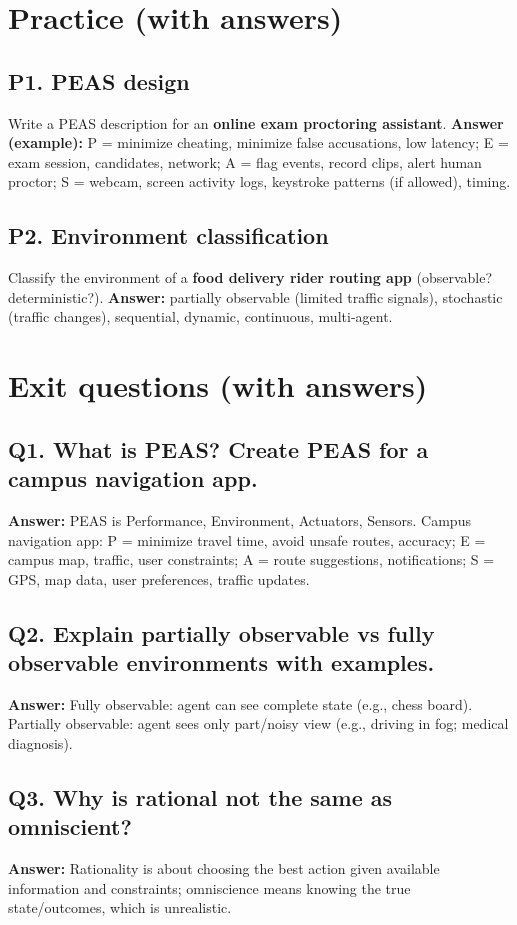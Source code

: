 \documentclass[11pt]{article}
\begin{document}
\section{Practice (with answers)}

\subsection*{P1. PEAS design}
Write a PEAS description for an \textbf{online exam proctoring assistant}.
\textbf{Answer (example):} P = minimize cheating, minimize false accusations, low latency; E = exam session, candidates, network; A = flag events, record clips, alert human proctor; S = webcam, screen activity logs, keystroke patterns (if allowed), timing.

\subsection*{P2. Environment classification}
Classify the environment of a \textbf{food delivery rider routing app} (observable? deterministic?).
\textbf{Answer:} partially observable (limited traffic signals), stochastic (traffic changes), sequential, dynamic, continuous, multi-agent.

\section{Exit questions (with answers)}

\subsection*{Q1. What is PEAS? Create PEAS for a campus navigation app.}
\textbf{Answer:} PEAS is Performance, Environment, Actuators, Sensors.
Campus navigation app: P = minimize travel time, avoid unsafe routes, accuracy; E = campus map, traffic, user constraints; A = route suggestions, notifications; S = GPS, map data, user preferences, traffic updates.

\subsection*{Q2. Explain partially observable vs fully observable environments with examples.}
\textbf{Answer:} Fully observable: agent can see complete state (e.g., chess board). Partially observable: agent sees only part/noisy view (e.g., driving in fog; medical diagnosis).

\subsection*{Q3. Why is rational not the same as omniscient?}
\textbf{Answer:} Rationality is about choosing the best action given available information and constraints; omniscience means knowing the true state/outcomes, which is unrealistic.
\end{document}
